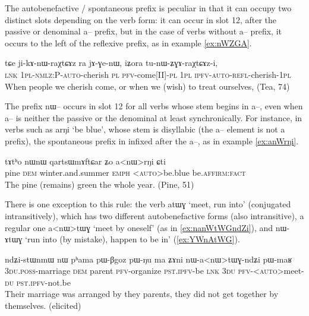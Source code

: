 \documentclass[oldfontcommands,oneside,a4paper,11pt]{article}
\newcommand{\ipa}[1]{{\phon \mbox{#1}}} %
\begin{document}
The autobenefactive / spontaneous prefix is peculiar in that it can occupy two distinct slots depending on the verb form: it can occur  in slot 12, after the passive or denominal \ipa{a--} prefix, but in the case of verbs without \ipa{a--} prefix, it occurs to the left of the reflexive prefix, as in example \ref{ex:nWZGA}.

\begin{exe}
\ex \label{ex:nWZGA}
\gll 
\ipa{tɕe}  	\ipa{ji-kɤ-nɯ-raχtɕɤz}  	\ipa{ra}  	\ipa{jɤ-ɣe-nɯ,}  	\ipa{iʑora}  	\ipa{tu-nɯ-ʑɣɤ-raχtɕɤz-i,}  \\
\textsc{lnk} \textsc{1pl-nmlz:P-auto}-cherish \textsc{pl} \textsc{pfv}-come[II]-\textsc{pl} \textsc{1pl} \textsc{ipfv-auto-refl}-cherish-\textsc{1pl} \\
\glt When people we cherish come, or when we (wish) to treat ourselves, (Tea, 74)
\end{exe}

The prefix \ipa{nɯ--} occurs in slot 12 for all verbs whose stem begins in \ipa{a--}, even when   \ipa{a--} is neither the passive or the denominal at least synchronically. For instance, in verbs such as \ipa{arŋi} `be blue', whose stem is disyllabic (the \ipa{a--} element is not a prefix), the spontaneous prefix in infixed after the \ipa{a--}, as in  example \ref{ex:anWrŋi}.

\begin{exe}
\ex \label{ex:anWrŋi}
\gll 
\ipa{tɤtʰo}  	\ipa{nɯnɯ}  	\ipa{qartsɯmɤftɕar}  	\ipa{ʑo}  	\ipa{a<nɯ>rŋi}  	\ipa{ɕti}  \\
pine \textsc{dem} winter.and.summer \textsc{emph} <\textsc{auto}>be.blue be.\textsc{affirm:fact} \\
\glt The pine (remains) green the whole year. (Pine, 51)
\end{exe}
 
 
 There is one exception to this rule: the verb \ipa{atɯɣ} `meet, run into' (conjugated intransitively), which has two different autobenefactive forms (also intransitive), a regular one \ipa{a<nɯ>tɯɣ} `meet by oneself' (as in \ref{ex:nanWtWGndZi}), and  \ipa{nɯ-ɤtɯɣ}  `run into (by mistake), happen to be in'   (\ref{ex:YWnAtWG}).
 
 \begin{exe}
\ex \label{ex:nanWtWGndZi}
\gll 
\ipa{ndʑi-stɯnmɯ}  	\ipa{nɯ}  	\ipa{pʰama}  	\ipa{pɯ-βgoz}  	\ipa{pɯ-ŋu}  	\ipa{ma}  	\ipa{ʑɤni}  	\ipa{nɯ-a<nɯ>tɯɣ-ndʑi}  	\ipa{pɯ-maʁ}  \\
\textsc{3du.poss}-marriage \textsc{dem} parent \textsc{pfv}-organize \textsc{pst.ipfv}-be \textsc{lnk} \textsc{3du} \textsc{pfv}-<\textsc{auto}>meet-\textsc{du}  \textsc{pst.ipfv}-not.be \\
\glt Their marriage was arranged by they parents, they did not get together by themselves. (elicited)
\end{exe}
\end{document}
